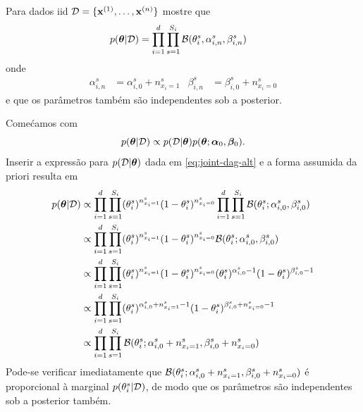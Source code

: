 \begin{exenumerate}
    \item Para dados iid $\mathcal{D} = \{\mathbf{x}^{(1)}, \ldots, \mathbf{x}^{(n)}\}$ mostre que 
    \begin{align}
        p(\boldsymbol{\theta} | \mathcal{D}) & = \prod_{i=1}^d \prod_{s=1}^{S_i} \mathcal{B}(\theta_i^s, \alpha_{i,n}^s, \beta_{i,n}^s)
    \end{align}
    onde
    \begin{align}
        \alpha_{i,n}^s & = \alpha_{i,0}^s + n_{x_i=1}^s &  \beta_{i,n}^s & = \beta_{i,0}^s + n_{x_i=0}^s
    \end{align}
    e que os par\^ametros tamb\'em s\~ao independentes sob a posterior.
    
    \begin{solution}
        Come\'camos com
        \begin{equation}
            p(\boldsymbol{\theta} | \mathcal{D}) \propto p(\mathcal{D} | \boldsymbol{\theta}) p(\boldsymbol{\theta}; \boldsymbol{\alpha}_0, \boldsymbol{\beta}_0).
        \end{equation}
        Inserir a express\~ao para $p(\mathcal{D} | \boldsymbol{\theta})$ dada em \eqref{eq:joint-dag-alt} e a forma assumida da priori resulta em
        \begin{align}
            p(\boldsymbol{\theta} | \mathcal{D}) &\propto  \prod_{i=1}^d \prod_{s=1}^{S_i}  (\theta_i^s)^{n_{x_i=1}^s} (1-\theta_i^s)^{n_{x_i=0}^s} \prod_{i=1}^d \prod_{s=1}^{S_i} \mathcal{B}(\theta_i^s; \alpha_{i,0}^s, \beta_{i,0}^s)\\
            & \propto \prod_{i=1}^d \prod_{s=1}^{S_i}   (\theta_i^s)^{n_{x_i=1}^s} (1-\theta_i^s)^{n_{x_i=0}^s}  \mathcal{B}(\theta_i^s; \alpha_{i,0}^s, \beta_{i,0}^s)\\
            & \propto \prod_{i=1}^d \prod_{s=1}^{S_i}   (\theta_i^s)^{n_{x_i=1}^s} (1-\theta_i^s)^{n_{x_i=0}^s} (\theta_i^s)^{\alpha_{i,0}^s-1} (1-\theta_i^s)^{\beta_{i,0}^s-1}\\
            & \propto \prod_{i=1}^d \prod_{s=1}^{S_i}   (\theta_i^s)^{\alpha_{i,0}^s+n_{x_i=1}^s-1} (1-\theta_i^s)^{\beta_{i,0}^s+n_{x_i=0}^s-1}\\
            & \propto \prod_{i=1}^d \prod_{s=1}^{S_i} \mathcal{B}(\theta_i^s; \alpha_{i,0}^s+n_{x_i=1}^s, \beta_{i,0}^s+n_{x_i=0}^s)
        \end{align}
        Pode-se verificar imediatamente que $\mathcal{B}(\theta_i^s; \alpha_{i,0}^s+n_{x_i=1}^s, \beta_{i,0}^s+n_{x_i=0}^s)$ \'e proporcional \`a marginal $p(\theta_i^s | \mathcal{D})$, de modo que os par\^ametros s\~ao independentes sob a posterior tamb\'em.
    \end{solution}
    

\end{exenumerate}
